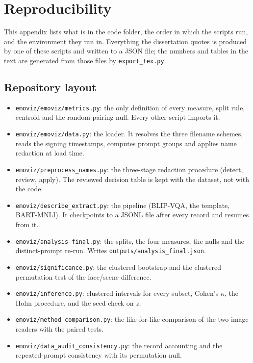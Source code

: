 \chapter{Reproducibility}
\label{app:repro}

\begin{sloppypar}

This appendix lists what is in the code folder, the order in which the scripts run, and the environment they ran in. Everything the dissertation quotes is produced by one of these scripts and written to a JSON file; the numbers and tables in the text are generated from those files by \texttt{export\_tex.py}.

\section{Repository layout}
\begin{itemize}\setlength{\itemsep}{1pt}
\item \texttt{emoviz/emoviz/metrics.py}: the only definition of every measure, split rule, centroid and the random-pairing null. Every other script imports it.
\item \texttt{emoviz/emoviz/data.py}: the loader. It resolves the three filename schemes, reads the signing timestamps, computes prompt groups and applies name redaction at load time.
\item \texttt{emoviz/preprocess\_names.py}: the three-stage redaction procedure (detect, review, apply). The reviewed decision table is kept with the dataset, not with the code.
\item \texttt{emoviz/describe\_extract.py}: the pipeline (BLIP-VQA, the template, BART-MNLI). It checkpoints to a JSONL file after every record and resumes from it.
\item \texttt{emoviz/analysis\_final.py}: the splits, the four measures, the nulls and the distinct-prompt re-run. Writes \texttt{outputs/analysis\_final.json}.
\item \texttt{emoviz/significance.py}: the clustered bootstrap and the clustered permutation test of the face/scene difference.
\item \texttt{emoviz/inference.py}: clustered intervals for every subset, Cohen's $\kappa$, the Holm procedure, and the seed check on $z$.
\item \texttt{emoviz/method\_comparison.py}: the like-for-like comparison of the two image readers with the paired tests.
\item \texttt{emoviz/data\_audit\_consistency.py}: the record accounting and the repeated-prompt consistency with its permutation null.

\end{itemize}
\end{sloppypar}
